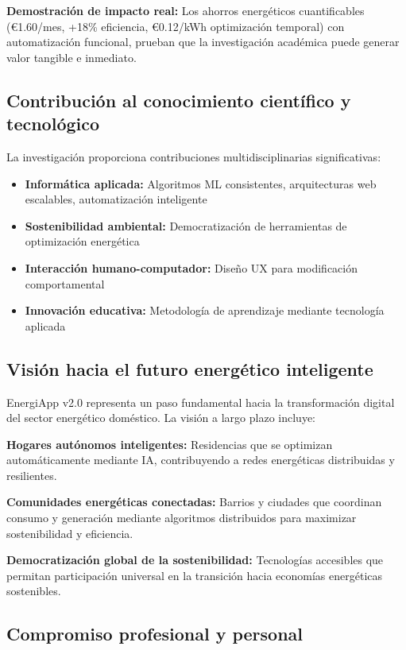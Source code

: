 \textbf{Demostración de impacto real:} Los ahorros energéticos cuantificables (€1.60/mes, +18\% eficiencia, €0.12/kWh optimización temporal) con automatización funcional, prueban que la investigación académica puede generar valor tangible e inmediato.

\subsection{Contribución al conocimiento científico y tecnológico}

La investigación proporciona contribuciones multidisciplinarias significativas:

\begin{itemize}
    \item \textbf{Informática aplicada:} Algoritmos ML consistentes, arquitecturas web escalables, automatización inteligente
    \item \textbf{Sostenibilidad ambiental:} Democratización de herramientas de optimización energética
    \item \textbf{Interacción humano-computador:} Diseño UX para modificación comportamental
    \item \textbf{Innovación educativa:} Metodología de aprendizaje mediante tecnología aplicada
\end{itemize}

\subsection{Visión hacia el futuro energético inteligente}

EnergiApp v2.0 representa un paso fundamental hacia la transformación digital del sector energético doméstico. La visión a largo plazo incluye:

\textbf{Hogares autónomos inteligentes:} Residencias que se optimizan automáticamente mediante IA, contribuyendo a redes energéticas distribuidas y resilientes.

\textbf{Comunidades energéticas conectadas:} Barrios y ciudades que coordinan consumo y generación mediante algoritmos distribuidos para maximizar sostenibilidad y eficiencia.

\textbf{Democratización global de la sostenibilidad:} Tecnologías accesibles que permitan participación universal en la transición hacia economías energéticas sostenibles.

\subsection{Compromiso profesional y personal}

